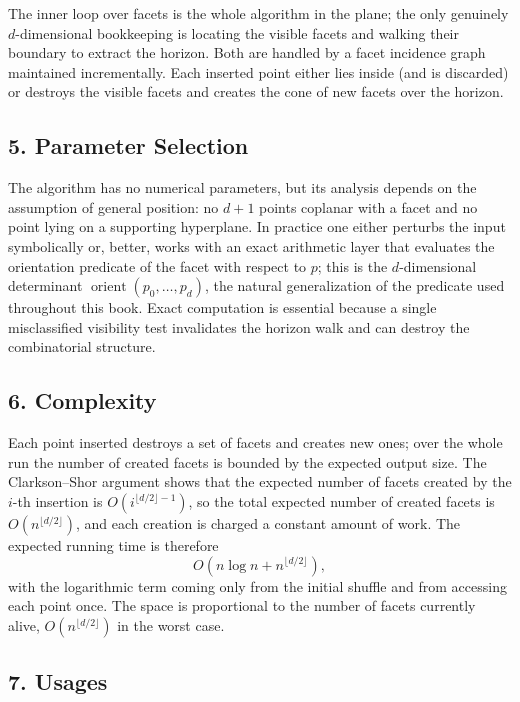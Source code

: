 The inner loop over facets is the whole algorithm in the plane; the only
genuinely $d$-dimensional bookkeeping is locating the visible facets and
walking their boundary to extract the horizon. Both are handled by a facet
incidence graph maintained incrementally. Each inserted point either lies
inside (and is discarded) or destroys the visible facets and creates the cone
of new facets over the horizon.

\subsection{5. Parameter Selection}

The algorithm has no numerical parameters, but its analysis depends on the
assumption of general position: no $d+1$ points coplanar with a facet and no
point lying on a supporting hyperplane. In practice one either perturbs the
input symbolically or, better, works with an exact arithmetic layer that
evaluates the orientation predicate of the facet with respect to $p$; this is
the $d$-dimensional determinant
$\operatorname{orient}(p_0,\dots,p_d)$, the natural generalization of the
predicate used throughout this book. Exact computation is essential because a
single misclassified visibility test invalidates the horizon walk and can
destroy the combinatorial structure.

\subsection{6. Complexity}

Each point inserted destroys a set of facets and creates new ones; over the
whole run the number of created facets is bounded by the expected output size.
The Clarkson--Shor argument shows that the expected number of facets created
by the $i$-th insertion is $O(i^{\lfloor d/2 \rfloor - 1})$, so the total
expected number of created facets is $O(n^{\lfloor d/2 \rfloor})$, and each
creation is charged a constant amount of work. The expected running time is
therefore
\[
O(n \log n + n^{\lfloor d/2 \rfloor}),
\]
with the logarithmic term coming only from the initial shuffle and from
accessing each point once. The space is proportional to the number of facets
currently alive, $O(n^{\lfloor d/2 \rfloor})$ in the worst case.

\subsection{7. Usages}

